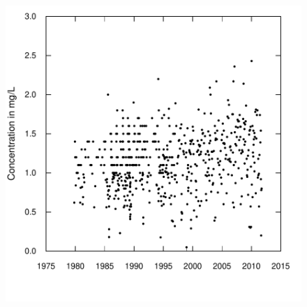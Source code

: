 \documentclass[a4paper,11pt]{article}
\begin{document}
\begin{figure}[htbp]
  \begin{minipage}[h]{0.5\linewidth}
    \begin{center}

\includegraphics{EGRET-figplotConcTime}
    \label{fig:plotConcTime}
    \end{center}
  \end{minipage}
  \hspace{0.5cm}
  \begin{minipage}[h]{0.5\linewidth}
    \begin{center}



\end{center}
\end{minipage}
\end{figure}
\end{document}
